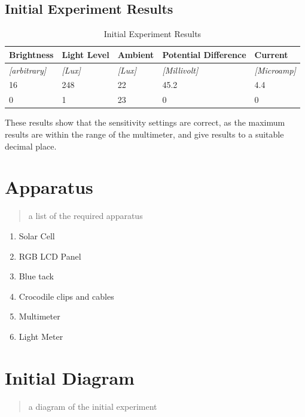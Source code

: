 \documentclass{article}
\begin{document}
\subsection{Initial Experiment Results}
\begin{table}[!ht]
\centering
\caption{Initial Experiment Results}
\label{Initial Experiment Results}
\begin{tabular}{|l|l|l|l|l|}
\hline
\textbf{Brightness}      & \textbf{Light Level} & \textbf{Ambient}   & \textbf{Potential Difference} & \textbf{Current}        \\ \hline
\textit{{[}arbitrary{]}} & \textit{{[}Lux{]}}   & \textit{{[}Lux{]}} & \textit{{[}Millivolt{]}}      & \textit{{[}Microamp{]}} \\ \hline
16                       & 248                  & 22                 & 45.2                          & 4.4                     \\ \hline
0                        & 1                    & 23                 & 0                             & 0                       \\ \hline
\end{tabular}
\end{table}
These results show that the sensitivity settings are correct, as the maximum results are within the range of the multimeter, and give results to a suitable decimal place.


\section{Apparatus}
\begin{quote}
a list of the required apparatus
\end{quote}
\begin{enumerate}
  \item Solar Cell
  \item RGB LCD Panel
  \item Blue tack
  \item Crocodile clips and cables
  \item Multimeter
  \item Light Meter
\end{enumerate}

\section{Initial Diagram}
\begin{quote}
a diagram of the initial experiment
\end{quote}
\end{document}
